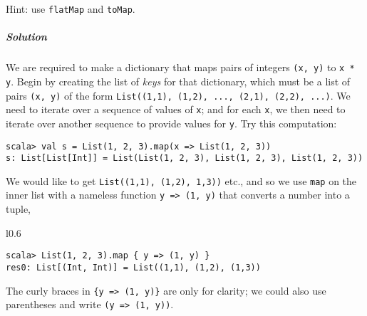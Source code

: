 Hint: use \lstinline!flatMap! and \lstinline!toMap!.

\subparagraph{Solution}

We are required to make a dictionary that maps pairs of integers \lstinline!(x, y)!
to \lstinline!x * y!. Begin by creating the list of \emph{keys} for
that dictionary, which must be a list of pairs \lstinline!(x, y)!
of the form \lstinline!List((1,1), (1,2), ..., (2,1), (2,2), ...)!.
We need to iterate over a sequence of values of \lstinline!x!; and
for each \lstinline!x!, we then need to iterate over another sequence
to provide values for \lstinline!y!. Try this computation:
\begin{lstlisting}
scala> val s = List(1, 2, 3).map(x => List(1, 2, 3))
s: List[List[Int]] = List(List(1, 2, 3), List(1, 2, 3), List(1, 2, 3))
\end{lstlisting}
We would like to get \lstinline!List((1,1), (1,2), 1,3))! etc., and
so we use \lstinline!map! on the inner list with a nameless function
\lstinline!y => (1, y)! that converts a number into a tuple,

\begin{wrapfigure}{l}{0.6\columnwidth}%
\vspace{-0.75\baselineskip}
\begin{lstlisting}
scala> List(1, 2, 3).map { y => (1, y) }
res0: List[(Int, Int)] = List((1,1), (1,2), (1,3))
\end{lstlisting}
\vspace{-1.5\baselineskip}
\end{wrapfigure}%

\noindent The curly braces in \lstinline!{y => (1, y)}! are only
for clarity; we could also use parentheses and write \lstinline!(y => (1, y))!. 


